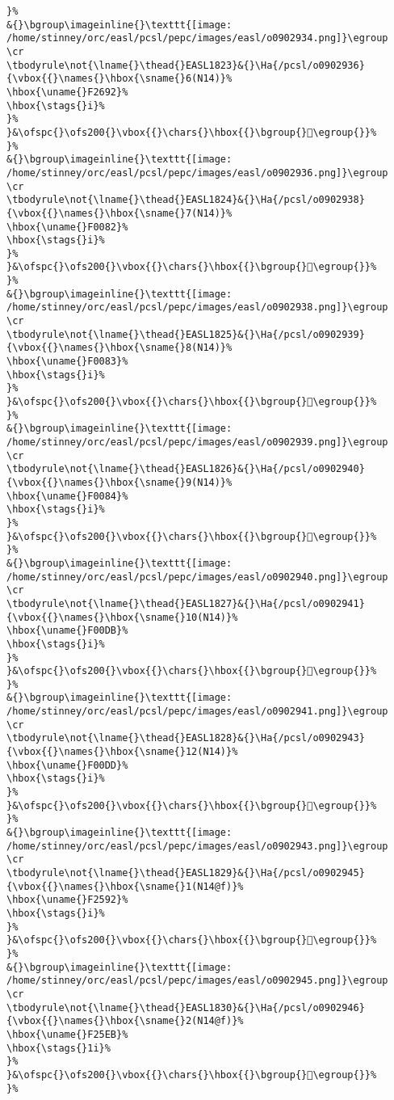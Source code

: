 \begin{verbatim}
}%
&{}\bgroup\imageinline{}\texttt{[image: /home/stinney/orc/easl/pcsl/pepc/images/easl/o0902934.png]}\egroup
\cr
\tbodyrule\not{\lname{}\thead{}EASL1823}&{}\Ha{/pcsl/o0902936}{\vbox{{}\names{}\hbox{\sname{}6(N14)}%
\hbox{\uname{}F2692}%
\hbox{\stags{}i}%
}%
}&\ofspc{}\ofs200{}\vbox{{}\chars{}\hbox{{}\bgroup{}󲚒\egroup{}}%
}%
&{}\bgroup\imageinline{}\texttt{[image: /home/stinney/orc/easl/pcsl/pepc/images/easl/o0902936.png]}\egroup
\cr
\tbodyrule\not{\lname{}\thead{}EASL1824}&{}\Ha{/pcsl/o0902938}{\vbox{{}\names{}\hbox{\sname{}7(N14)}%
\hbox{\uname{}F0082}%
\hbox{\stags{}i}%
}%
}&\ofspc{}\ofs200{}\vbox{{}\chars{}\hbox{{}\bgroup{}󰂂\egroup{}}%
}%
&{}\bgroup\imageinline{}\texttt{[image: /home/stinney/orc/easl/pcsl/pepc/images/easl/o0902938.png]}\egroup
\cr
\tbodyrule\not{\lname{}\thead{}EASL1825}&{}\Ha{/pcsl/o0902939}{\vbox{{}\names{}\hbox{\sname{}8(N14)}%
\hbox{\uname{}F0083}%
\hbox{\stags{}i}%
}%
}&\ofspc{}\ofs200{}\vbox{{}\chars{}\hbox{{}\bgroup{}󰂃\egroup{}}%
}%
&{}\bgroup\imageinline{}\texttt{[image: /home/stinney/orc/easl/pcsl/pepc/images/easl/o0902939.png]}\egroup
\cr
\tbodyrule\not{\lname{}\thead{}EASL1826}&{}\Ha{/pcsl/o0902940}{\vbox{{}\names{}\hbox{\sname{}9(N14)}%
\hbox{\uname{}F0084}%
\hbox{\stags{}i}%
}%
}&\ofspc{}\ofs200{}\vbox{{}\chars{}\hbox{{}\bgroup{}󰂄\egroup{}}%
}%
&{}\bgroup\imageinline{}\texttt{[image: /home/stinney/orc/easl/pcsl/pepc/images/easl/o0902940.png]}\egroup
\cr
\tbodyrule\not{\lname{}\thead{}EASL1827}&{}\Ha{/pcsl/o0902941}{\vbox{{}\names{}\hbox{\sname{}10(N14)}%
\hbox{\uname{}F00DB}%
\hbox{\stags{}i}%
}%
}&\ofspc{}\ofs200{}\vbox{{}\chars{}\hbox{{}\bgroup{}󰃛\egroup{}}%
}%
&{}\bgroup\imageinline{}\texttt{[image: /home/stinney/orc/easl/pcsl/pepc/images/easl/o0902941.png]}\egroup
\cr
\tbodyrule\not{\lname{}\thead{}EASL1828}&{}\Ha{/pcsl/o0902943}{\vbox{{}\names{}\hbox{\sname{}12(N14)}%
\hbox{\uname{}F00DD}%
\hbox{\stags{}i}%
}%
}&\ofspc{}\ofs200{}\vbox{{}\chars{}\hbox{{}\bgroup{}󰃝\egroup{}}%
}%
&{}\bgroup\imageinline{}\texttt{[image: /home/stinney/orc/easl/pcsl/pepc/images/easl/o0902943.png]}\egroup
\cr
\tbodyrule\not{\lname{}\thead{}EASL1829}&{}\Ha{/pcsl/o0902945}{\vbox{{}\names{}\hbox{\sname{}1(N14@f)}%
\hbox{\uname{}F2592}%
\hbox{\stags{}i}%
}%
}&\ofspc{}\ofs200{}\vbox{{}\chars{}\hbox{{}\bgroup{}󲖒\egroup{}}%
}%
&{}\bgroup\imageinline{}\texttt{[image: /home/stinney/orc/easl/pcsl/pepc/images/easl/o0902945.png]}\egroup
\cr
\tbodyrule\not{\lname{}\thead{}EASL1830}&{}\Ha{/pcsl/o0902946}{\vbox{{}\names{}\hbox{\sname{}2(N14@f)}%
\hbox{\uname{}F25EB}%
\hbox{\stags{}1i}%
}%
}&\ofspc{}\ofs200{}\vbox{{}\chars{}\hbox{{}\bgroup{}󲗫\egroup{}}%
}%

\end{verbatim}
